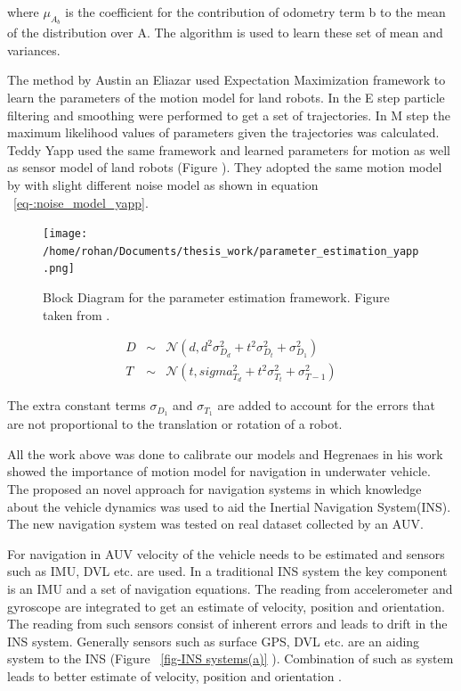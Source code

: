 \documentclass[12pt,draft]{dalcsthesis}
\begin{document}
where $\mu_{A_{b}}$ is the coefficient for the contribution of odometry term b to the mean of the distribution over A. The algorithm is used to learn these set of mean and variances.

The method by Austin an Eliazar used Expectation Maximization framework to learn the parameters of the motion model for land robots. In the E step particle filtering and smoothing were performed to get a set of trajectories. In M step the maximum likelihood values of parameters given the trajectories was calculated. Teddy Yapp \cite{Yap2008} used the same framework and learned parameters for motion as well as sensor model of land robots (Figure ). They adopted the same motion model by with slight different noise model as shown in equation ~\ref{eq-:noise_model_yapp}.
\begin{figure}
  \centering
     {\texttt{[image: /home/rohan/Documents/thesis\_work/parameter\_estimation\_yapp.png]}}
  \caption{\label{fig-parameter_estimation Yapp} Block Diagram for the parameter estimation framework. Figure taken from \cite{Yapp2008}.}
\end{figure}

\begin{equation}
\label{eq-:noise_model_yapp}
\begin{aligned}
D &\sim& \mathcal{{N}}(d,d^2\sigma_{D_{d}}^2+t^2\sigma_{D_{t}}^2+\sigma_{D_{1}}^2) \\
T &\sim& \mathcal{{N}}(t,sigma_{T_{d}}^2+t^2\sigma_{T_{t}}^2+\sigma_{T-{1}}^2)
\end{aligned}
\end{equation}

The extra constant terms $\sigma_{D_{1}}$ and $\sigma_{T_{1}}$ are added to account for the errors that are not proportional to the translation or rotation of a robot. 

All the work above was done to calibrate our models and Hegrenaes \cite{Hegrenæs2008} in his work showed the importance of motion model for navigation in underwater vehicle. The proposed an novel approach for navigation systems in which knowledge about the vehicle dynamics was used to aid the Inertial Navigation System(INS). The new navigation system was tested on real dataset collected by an AUV.

For navigation in AUV velocity of the vehicle needs to be estimated and sensors such as IMU, DVL etc. are used. In a traditional INS system the key component is an IMU and a set of navigation equations. The reading from accelerometer and gyroscope are integrated to get an estimate of velocity, position and orientation. The reading from such sensors consist of inherent errors and leads to drift in the INS system. Generally sensors such as surface GPS, DVL etc. are an aiding system to the INS (Figure ~\ref{fig-INS systems(a)} ). Combination of such as system leads to better estimate of velocity, position and orientation \cite{leonard1998autonomous}. 
\end{document}
